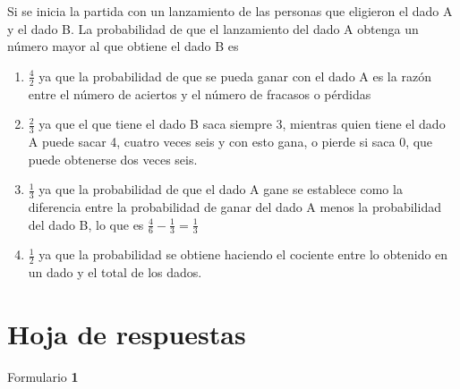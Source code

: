 \documentclass[10pt,twoside]{article}
\begin{document}
\begin{enumerate}
\begin{center}
\begin{tabular}{|c|p{1cm}|p{1cm}|p{1cm}|p{1cm}|p{1cm}|c|}
\end{tabular}
\end{center}
Si se inicia la partida con un lanzamiento de las personas que eligieron el dado A y el dado B. La probabilidad de que el lanzamiento del dado A obtenga un número mayor al que obtiene el dado B es
\begin{enumerate}
  \item $ \frac{4}{2} $ ya que la probabilidad de que se pueda ganar con el dado A es la razón entre el número de aciertos y el número de fracasos o pérdidas
  \item $ \frac{2}{3} $ ya que el que tiene el dado B saca siempre 3, mientras quien tiene el dado A puede sacar 4, cuatro veces seis y con esto gana, o pierde si saca 0, que puede obtenerse dos veces seis.
  \item $ \frac{1}{3} $ ya que la probabilidad de que el dado A gane se establece como la diferencia entre la probabilidad de ganar del dado A menos la probabilidad del dado B, lo que es $ \frac{4}{6}-\frac{1}{3}=\frac{1}{3} $
  \item $ \frac{1}{2} $ ya que la probabilidad se obtiene haciendo el cociente entre lo obtenido en un dado y el total de los dados.
\end{enumerate}
\end{enumerate}
\newpage
\section*{Hoja de respuestas}
Formulario \textbf{1}\\
\end{document}
